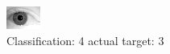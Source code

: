 \begin{figure}[h!]
\begin{center}
\includegraphics[width=0.60\columnwidth]{figures/ID2163_class_4_target_3.png}
\end{center}
\caption{ Classification: 4 actual target: 3}
\label{fig:ID2163_class_4_target_3}
\end{figure}
